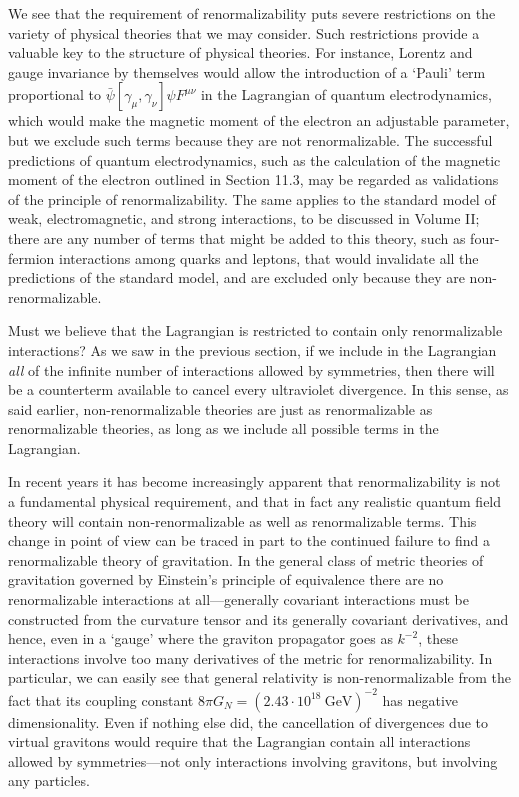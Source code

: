 We see that the requirement of renormalizability puts severe restrictions on
the variety of physical theories that we may consider. Such restrictions
provide a valuable key to the structure of physical theories. For instance,
Lorentz and gauge invariance by themselves would allow the introduction of a
`Pauli' term proportional to $\bar\psi[\gamma_\mu,\gamma_\nu]\psi F^{\mu\nu}$
in the Lagrangian of quantum electrodynamics, which would make the magnetic
moment of the electron an adjustable parameter, but we exclude such terms
because they are not renormalizable. The successful predictions of quantum
electrodynamics, such as the calculation of the magnetic moment of the
electron outlined in Section 11.3, may be regarded as validations of the
principle of renormalizability. The same applies to the standard model of
weak, electromagnetic, and strong interactions, to be discussed in Volume
II; there are any number of terms that might be added to this theory, such as
four-fermion interactions among quarks and leptons, that would invalidate all
the predictions of the standard model, and are excluded only because they are
non-renormalizable.

Must we believe that the Lagrangian is restricted to contain only
renormalizable interactions? As we saw in the previous section, if we include
in the Lagrangian \emph{all} of the infinite number of interactions allowed by
symmetries, then there will be a counterterm available to cancel every
ultraviolet divergence. In this sense, as said earlier, non-renormalizable
theories are just as renormalizable as renormalizable theories, as long as we
include all possible terms in the Lagrangian.

In recent years it has become increasingly apparent that renormalizability is
not a fundamental physical requirement, and that in fact any realistic
quantum field theory will contain non-renormalizable as well as renormalizable
terms. This change in point of view can be traced in part to the continued
failure to find a renormalizable theory of gravitation. In the general class
of metric theories of gravitation governed by Einstein's principle of
equivalence there are no renormalizable interactions at all---generally
covariant interactions must be constructed from the curvature tensor and its
generally covariant derivatives, and hence, even in a `gauge' where the
graviton propagator goes as $k^{-2}$, these interactions involve too many
derivatives of the metric for renormalizability. In particular, we can easily
see that general relativity is non-renormalizable from the fact that its
coupling constant $8\pi G_N=(2.43\cdot 10^{18}\ \mathrm{GeV})^{-2}$ has
negative dimensionality. Even if nothing else did, the cancellation of
divergences due to virtual gravitons would require that the Lagrangian contain
all interactions allowed by symmetries---not only interactions involving
gravitons, but involving any particles.

